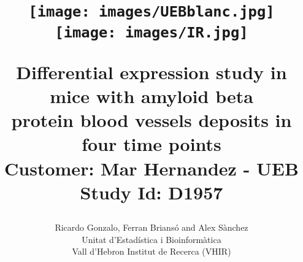 \documentclass{article}
\renewcommand*\footnoterule{}
\begin{document}
\title{\begin{figure}[htbp]
       \centering
       \texttt{[image: images/UEBblanc.jpg]}
       \texttt{[image: images/IR.jpg]}
       \end{figure}
       \vspace{1cm}
       Differential expression study in mice with amyloid beta\\
       protein blood vessels deposits in four time points\\
       {\normalsize Customer: Mar Hernandez - UEB Study Id: D1957
        \footnotetext{\footnoterule{\tiny\textcolor{violet}{VHIR-UEB-FOR-013v.01}}}
        }}\\
\author{Ricardo Gonzalo, Ferran Brians\'{o} and Alex S\`{a}nchez \\ 
        Unitat d'Estad\'{i}stica i Bioinform\`{a}tica \\
        Vall d'Hebron Institut de Recerca (VHIR)} \\




\maketitle

\newpage
\tableofcontents
\listoffigures
\listoftables

 




\end{document}
